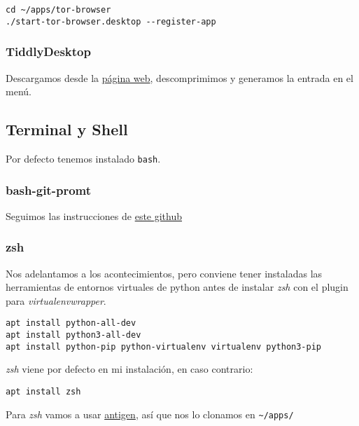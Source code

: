 \documentclass[
  12pt,
  spanish,
]{article}
\begin{document}
\begin{verbatim}
cd ~/apps/tor-browser
./start-tor-browser.desktop --register-app
\end{verbatim}

\hypertarget{tiddlydesktop}{%
\subsubsection{TiddlyDesktop}\label{tiddlydesktop}}

Descargamos desde la
\href{https://github.com/Jermolene/TiddlyDesktop}{página web},
descomprimimos y generamos la entrada en el menú.

\hypertarget{terminal-y-shell}{%
\subsection{Terminal y Shell}\label{terminal-y-shell}}

Por defecto tenemos instalado \texttt{bash}.

\hypertarget{bash-git-promt}{%
\subsubsection{bash-git-promt}\label{bash-git-promt}}

Seguimos las instrucciones de
\href{https://github.com/magicmonty/bash-git-prompt}{este github}

\hypertarget{zsh}{%
\subsubsection{zsh}\label{zsh}}

Nos adelantamos a los acontecimientos, pero conviene tener instaladas
las herramientas de entornos virtuales de python antes de instalar
\emph{zsh} con el plugin para \emph{virtualenvwrapper}.

\begin{verbatim}
apt install python-all-dev
apt install python3-all-dev
apt install python-pip python-virtualenv virtualenv python3-pip
\end{verbatim}

\emph{zsh} viene por defecto en mi instalación, en caso contrario:

\begin{verbatim}
apt install zsh
\end{verbatim}

Para \emph{zsh} vamos a usar
\href{https://github.com/zsh-users/antigen}{antigen}, así que nos lo
clonamos en \texttt{\textasciitilde{}/apps/}
\end{document}

